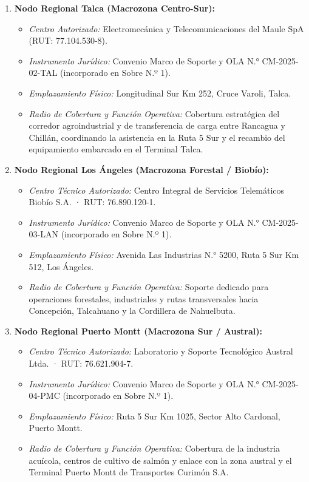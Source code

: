 \begin{enumerate}
  \item \textbf{Nodo Regional Talca (Macrozona Centro-Sur):}
  \begin{itemize}
    \item \textit{Centro Autorizado:} Electromecánica y Telecomunicaciones del Maule SpA (RUT: 77.104.530-8).
    \item \textit{Instrumento Jurídico:} Convenio Marco de Soporte y OLA N.° CM-2025-02-TAL (incorporado en Sobre N.º 1).
    \item \textit{Emplazamiento Físico:} Longitudinal Sur Km 252, Cruce Varoli, Talca.
    \item \textit{Radio de Cobertura y Función Operativa:} Cobertura estratégica del corredor agroindustrial y de transferencia de carga entre Rancagua y Chillán, coordinando la asistencia en la Ruta 5 Sur y el recambio del equipamiento embarcado en el Terminal Talca.
  \end{itemize}

  \item \textbf{Nodo Regional Los Ángeles (Macrozona Forestal / Biobío):}
  \begin{itemize}
    \item \textit{Centro Técnico Autorizado:} Centro Integral de Servicios Telemáticos Biobío S.A. · RUT: 76.890.120-1.
    \item \textit{Instrumento Jurídico:} Convenio Marco de Soporte y OLA N.° CM-2025-03-LAN (incorporado en Sobre N.º 1).
    \item \textit{Emplazamiento Físico:} Avenida Las Industrias N.° 5200, Ruta 5 Sur Km 512, Los Ángeles.
    \item \textit{Radio de Cobertura y Función Operativa:} Soporte dedicado para operaciones forestales, industriales y rutas transversales hacia Concepción, Talcahuano y la Cordillera de Nahuelbuta.
  \end{itemize}

  \item \textbf{Nodo Regional Puerto Montt (Macrozona Sur / Austral):}
  \begin{itemize}
    \item \textit{Centro Técnico Autorizado:} Laboratorio y Soporte Tecnológico Austral Ltda. · RUT: 76.621.904-7.
    \item \textit{Instrumento Jurídico:} Convenio Marco de Soporte y OLA N.° CM-2025-04-PMC (incorporado en Sobre N.º 1).
    \item \textit{Emplazamiento Físico:} Ruta 5 Sur Km 1025, Sector Alto Cardonal, Puerto Montt.
    \item \textit{Radio de Cobertura y Función Operativa:} Cobertura de la industria acuícola, centros de cultivo de salmón y enlace con la zona austral y el Terminal Puerto Montt de Transportes Curimón S.A.
  \end{itemize}
\end{enumerate}

